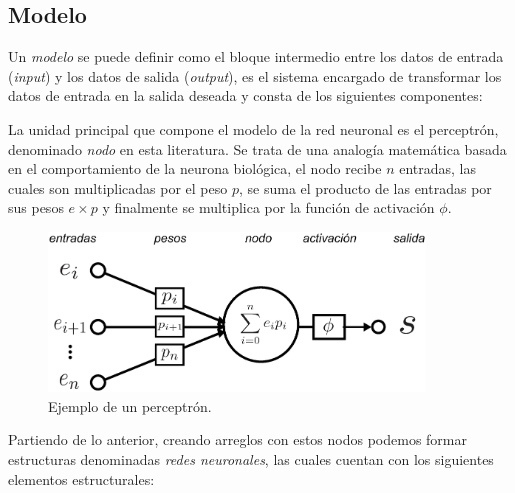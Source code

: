 \subsection{Modelo}
Un \emph{modelo} se puede definir como el bloque intermedio entre los datos de entrada (\emph{input}) y los datos de salida (\emph{output}), es el sistema encargado de transformar los datos de entrada en la salida deseada y consta de los siguientes componentes:

La unidad principal que compone el modelo de la red neuronal es el perceptrón, denominado \emph{nodo} en esta literatura. Se trata de una analogía matemática basada en el comportamiento de la neurona biológica, el nodo recibe $n$ entradas, las cuales son multiplicadas por el peso $p$, se suma el producto de las entradas por sus pesos $ e \times p$ y finalmente se multiplica por la función de activación $\phi$. 

\begin{figure}[b]
    \includegraphics[width=100mm]{Figuras/neural_network.eps}
    \centering
    \caption{Ejemplo de un perceptrón.}
    \label{fig:percep}
\end{figure}

Partiendo de lo anterior, creando arreglos con estos nodos podemos formar estructuras denominadas \emph{redes neuronales}, las cuales cuentan con los siguientes elementos estructurales:

